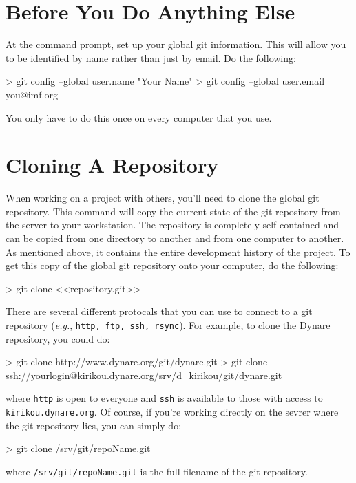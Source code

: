 \documentclass[10pt,letterpaper]{article}
\begin{document}
\section{Before You Do Anything Else}

At the command prompt, set up your global git information. This will allow you to be identified by name rather than just by email. Do the following:

\begin{code}
> git config --global user.name "Your Name"
> git config --global user.email you@imf.org
\end{code}
\noindent You only have to do this once on every computer that you use.

\section{Cloning A Repository}

When working on a project with others, you'll need to clone the global git repository. This command will copy the current state of the git repository from the server to your workstation. The repository is completely self-contained and can be copied from one directory to another and from one computer to another. As mentioned above, it contains the entire development history of the project. To get this copy of the global git repository onto your computer, do the following:

\begin{code}
> git clone <<repository.git>>
\end{code}
\noindent There are several different protocals that you can use to connect to a git repository (\textit{e.g.}, \texttt{http, ftp, ssh, rsync}). For example, to clone the Dynare repository, you could do:

\begin{code}
> git clone http://www.dynare.org/git/dynare.git
> git clone ssh://yourlogin@kirikou.dynare.org/srv/d_kirikou/git/dynare.git
\end{code}
\noindent where \texttt{http} is open to everyone and \texttt{ssh} is available to those with access to \texttt{kirikou.dynare.org}. Of course, if you're working directly on the sevrer where the git repository lies, you can simply do:

\begin{code}
> git clone /srv/git/repoName.git
\end{code}
\noindent where \texttt{/srv/git/repoName.git} is the full filename of the git repository.
\end{document}
